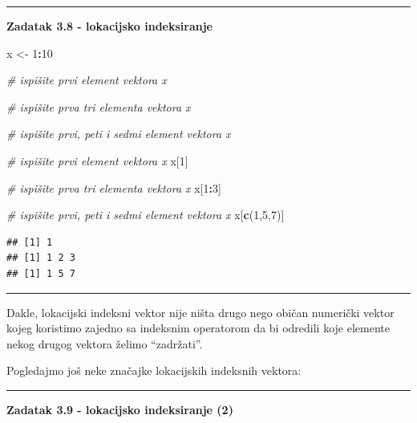 \documentclass[]{book}
\newenvironment{Shaded}{\begin{snugshade}}{\end{snugshade}}
\newcommand{\KeywordTok}[1]{\textcolor[rgb]{0.13,0.29,0.53}{\textbf{#1}}}
\newcommand{\DecValTok}[1]{\textcolor[rgb]{0.00,0.00,0.81}{#1}}
\newcommand{\StringTok}[1]{\textcolor[rgb]{0.31,0.60,0.02}{#1}}
\newcommand{\CommentTok}[1]{\textcolor[rgb]{0.56,0.35,0.01}{\textit{#1}}}
\newcommand{\OperatorTok}[1]{\textcolor[rgb]{0.81,0.36,0.00}{\textbf{#1}}}
\newcommand{\NormalTok}[1]{#1}
\theoremstyle{definition}
\theoremstyle{definition}
\theoremstyle{definition}
\theoremstyle{remark}
\begin{document}
\begin{center}\rule{0.5\linewidth}{\linethickness}\end{center}

\textbf{Zadatak 3.8 - lokacijsko indeksiranje}

\begin{Shaded}
\begin{Highlighting}[]
\NormalTok{x <-}\StringTok{ }\DecValTok{1}\OperatorTok{:}\DecValTok{10}

\CommentTok{# ispišite prvi element vektora x}

\CommentTok{# ispišite prva tri elementa vektora x}

\CommentTok{# ispišite prvi, peti i sedmi element vektora x}
\end{Highlighting}
\end{Shaded}

\begin{Shaded}
\begin{Highlighting}[]
\CommentTok{# ispišite prvi element vektora x}
\NormalTok{x[}\DecValTok{1}\NormalTok{]}

\CommentTok{# ispišite prva tri elementa vektora x}
\NormalTok{x[}\DecValTok{1}\OperatorTok{:}\DecValTok{3}\NormalTok{]}

\CommentTok{# ispišite prvi, peti i sedmi element vektora x}
\NormalTok{x[}\KeywordTok{c}\NormalTok{(}\DecValTok{1}\NormalTok{,}\DecValTok{5}\NormalTok{,}\DecValTok{7}\NormalTok{)]}
\end{Highlighting}
\end{Shaded}

\begin{verbatim}
## [1] 1
## [1] 1 2 3
## [1] 1 5 7
\end{verbatim}

\begin{center}\rule{0.5\linewidth}{\linethickness}\end{center}

Dakle, lokacijski indeksni vektor nije ništa drugo nego običan numerički
vektor kojeg koristimo zajedno sa indeksnim operatorom da bi odredili
koje elemente nekog drugog vektora želimo ``zadržati''.

Pogledajmo još neke značajke lokacijskih indeksnih vektora:

\begin{center}\rule{0.5\linewidth}{\linethickness}\end{center}

\textbf{Zadatak 3.9 - lokacijsko indeksiranje (2)}
\end{document}
